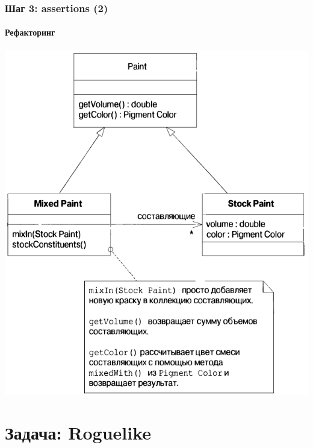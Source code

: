 \documentclass[xetex,mathserif,serif]{beamer}
\begin{document}
	\begin{frame}
		\frametitle{Шаг 3: assertions (2)}
		\framesubtitle{Рефакторинг}
		\begin{center}
			\includegraphics[height=0.8\textheight]{stockPaints.png}
		\end{center}
	\end{frame}

	\section{Задача: Roguelike}
\end{document}
